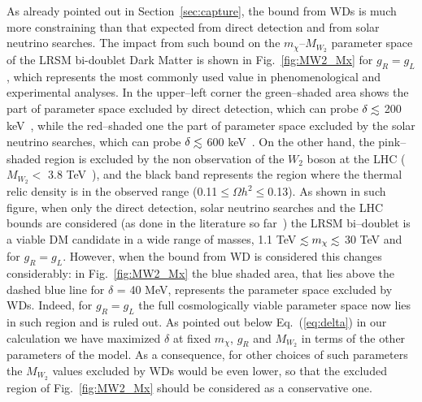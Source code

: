 \documentclass[11pt]{article}
\newcommand{\lsim}{\mathrel{\mathop{\kern 0pt \rlap
      {\raise.2ex\hbox{$<$}}}\lower.9ex\hbox{\kern-.190em $ \sim$}}}
\begin{document}
As already pointed out in Section~\ref{sec:capture}, the bound from WDs is much more constraining than that expected from direct detection and from solar neutrino searches. The impact from such bound on the $m_\chi$--$M_{W_2}$ parameter space of the LRSM bi-doublet Dark Matter is shown in Fig.~\ref{fig:MW2_Mx} for $g_R = g_L$, which represents the most commonly used value in phenomenological and experimental analyses. In the upper--left corner the green--shaded area shows the part of parameter space excluded by direct detection, which can probe $\delta\lsim$ 200 keV~\cite{iDM_DD_Nagata2014}, while the red--shaded one the part of parameter space excluded by the solar neutrino searches, which can probe $\delta\lsim$ 600 keV~\cite{idm_sun_Catena_2018}. On the other hand, the pink--shaded region is excluded by the non observation of the $W_2$ boson at the LHC ($M_{W_2}<$ 3.8 TeV~\cite{lch_mw2}), and the black band represents the region where the thermal relic density is in the observed range (0.11$\le \Omega h^2\le$0.13). As shown in such figure, when only the direct detection, solar neutrino searches and the LHC bounds are considered (as done in the literature so far~\cite{Garcia-Cely_LR_pheno}) the LRSM bi--doublet is a viable DM candidate in a wide range of masses, 1.1 TeV $\lsim m_\chi\lsim$ 30 TeV and for $g_R = g_L$. However, when the bound from WD is considered this changes considerably: in Fig.~\ref{fig:MW2_Mx} the blue shaded area, that lies above the dashed blue line for $\delta$ = 40 MeV, represents the parameter space excluded by WDs. Indeed, for $g_R = g_L$ the full cosmologically viable parameter space now lies in such region and is ruled out. As pointed out below Eq.~(\ref{eq:delta}) in our calculation we have maximized $\delta$ at fixed $m_\chi$, $g_R$ and $M_{W_2}$ in terms of the other parameters of the model. As a consequence, for other choices of such parameters the $M_{W_2}$ values excluded by WDs would be even lower, so that the excluded region of Fig.~\ref{fig:MW2_Mx} should be considered as a conservative one. 
\end{document}
